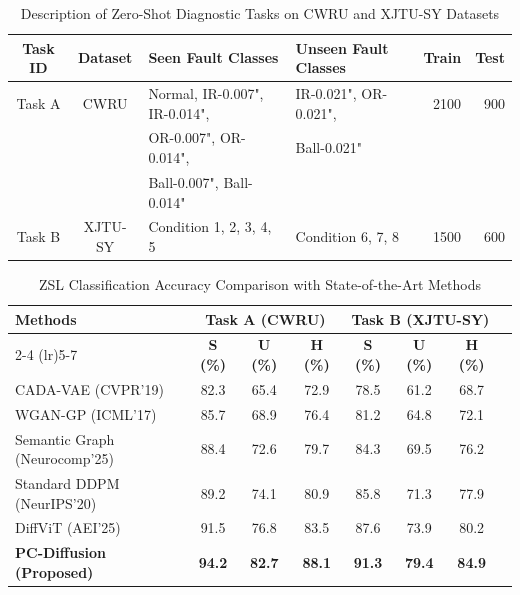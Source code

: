 \begin{table}[t]
\centering
\caption{Description of Zero-Shot Diagnostic Tasks on CWRU and XJTU-SY Datasets}
\label{tab:datasets}
\begin{tabular}{ccllrr}
\toprule
\textbf{Task ID} & \textbf{Dataset} & \textbf{Seen Fault Classes} & \textbf{Unseen Fault Classes} & \textbf{Train} & \textbf{Test} \\
\midrule
Task A & CWRU & Normal, IR-0.007", IR-0.014", & IR-0.021", OR-0.021", & 2100 & 900 \\
       &      & OR-0.007", OR-0.014", & Ball-0.021" & & \\
       &      & Ball-0.007", Ball-0.014" & & & \\
\midrule
Task B & XJTU-SY & Condition 1, 2, 3, 4, 5 & Condition 6, 7, 8 & 1500 & 600 \\
\bottomrule
\end{tabular}
\end{table}

\begin{table}[t]
\centering
\caption{ZSL Classification Accuracy Comparison with State-of-the-Art Methods}
\label{tab:performance}
\begin{tabular}{lccccccc}
\toprule
\multirow{2}{*}{\textbf{Methods}} & \multicolumn{3}{c}{\textbf{Task A (CWRU)}} & \multicolumn{3}{c}{\textbf{Task B (XJTU-SY)}} \\
\cmidrule(lr){2-4} \cmidrule(lr){5-7}
& \textbf{S (\%)} & \textbf{U (\%)} & \textbf{H (\%)} & \textbf{S (\%)} & \textbf{U (\%)} & \textbf{H (\%)} \\
\midrule
CADA-VAE (CVPR'19) & 82.3 & 65.4 & 72.9 & 78.5 & 61.2 & 68.7 \\
WGAN-GP (ICML'17) & 85.7 & 68.9 & 76.4 & 81.2 & 64.8 & 72.1 \\
Semantic Graph (Neurocomp'25) & 88.4 & 72.6 & 79.7 & 84.3 & 69.5 & 76.2 \\
Standard DDPM (NeurIPS'20) & 89.2 & 74.1 & 80.9 & 85.8 & 71.3 & 77.9 \\
DiffViT (AEI'25) & 91.5 & 76.8 & 83.5 & 87.6 & 73.9 & 80.2 \\
\midrule
\textbf{PC-Diffusion (Proposed)} & \textbf{94.2} & \textbf{82.7} & \textbf{88.1} & \textbf{91.3} & \textbf{79.4} & \textbf{84.9} \\
\bottomrule
\end{tabular}
\end{table}

